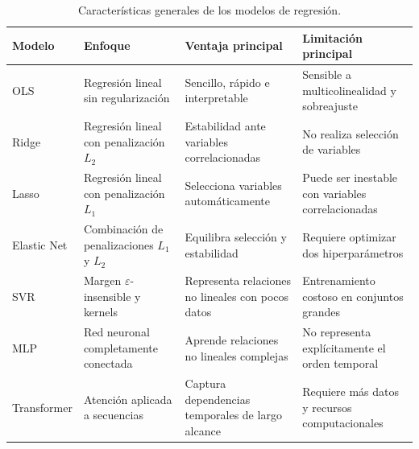 \begin{table}[H]
    \centering
    \caption{Características generales de los modelos de regresión.}
    \label{tab:comparacion_modelos}
    \begin{tabular}{
        >{\raggedright\arraybackslash}p{2.4cm}
        >{\raggedright\arraybackslash}p{3.4cm}
        >{\raggedright\arraybackslash}p{3.7cm}
        >{\raggedright\arraybackslash}p{3.7cm}
    }
        \toprule
        \textbf{Modelo} &
        \textbf{Enfoque} &
        \textbf{Ventaja principal} &
        \textbf{Limitación principal} \\
        \midrule

        OLS &
        Regresión lineal sin regularización &
        Sencillo, rápido e interpretable &
        Sensible a multicolinealidad y sobreajuste \\

        Ridge &
        Regresión lineal con penalización $L_2$ &
        Estabilidad ante variables correlacionadas &
        No realiza selección de variables \\

        Lasso &
        Regresión lineal con penalización $L_1$ &
        Selecciona variables automáticamente &
        Puede ser inestable con variables correlacionadas \\

        Elastic Net &
        Combinación de penalizaciones $L_1$ y $L_2$ &
        Equilibra selección y estabilidad &
        Requiere optimizar dos hiperparámetros \\

        SVR &
        Margen $\varepsilon$-insensible y kernels &
        Representa relaciones no lineales con pocos datos &
        Entrenamiento costoso en conjuntos grandes \\

        MLP &
        Red neuronal completamente conectada &
        Aprende relaciones no lineales complejas &
        No representa explícitamente el orden temporal \\

        Transformer &
        Atención aplicada a secuencias &
        Captura dependencias temporales de largo alcance &
        Requiere más datos y recursos computacionales \\

        \bottomrule
    \end{tabular}
\end{table}


